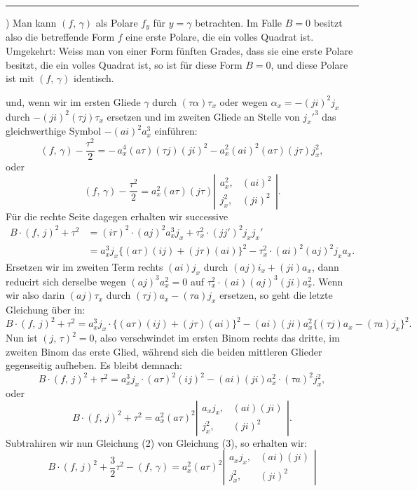 \documentclass[11pt]{article}
\providecommand{\weberpage}[1]{}
\providecommand{\weq}[2]{\begin{equation}\tag{#1}#2\end{equation}}
\begin{document}
\rule{4cm}{0.4pt}

\noindent *) Man kann $(f,\,\gamma)$ als Polare $f_y$ f\"ur $y=\gamma$ betrachten. Im Falle $B=0$
besitzt also die betreffende Form $f$ eine erste Polare, die ein volles Quadrat ist.
Umgekehrt: Weiss man von einer Form f\"unften Grades, dass sie eine erste Polare
besitzt, die ein volles Quadrat ist, so ist f\"ur diese Form $B=0$, und diese Polare
ist mit $(f,\,\gamma)$ identisch.


\weberpage{264}
und, wenn wir im ersten Gliede $\gamma$ durch $(\tau\alpha)\tau_x$ oder wegen $\alpha_x=-(ji)^2j_x$
durch $-(ji)^2(\tau j)\tau_x$ ersetzen und im zweiten Gliede an Stelle von $j_x'^3$
das gleichwerthige Symbol $-(ai)^2a_x^3$ einf\"uhren:
\[
(f,\,\gamma) - \frac{\tau^2}{2} = -\,a_x^4(a\tau)(\tau j)(ji)^2 - a_x^2(ai)^2(a\tau)(j\tau)j_x^2,
\]
oder
\weq{2}{(f,\,\gamma) - \frac{\tau^2}{2} = a_x^2(a\tau)(j\tau)\left|\begin{array}{cc} a_x^2, & (ai)^2 \\ j_x^2, & (ji)^2 \end{array}\right|.}
F\"ur die rechte Seite dagegen erhalten wir successive
\[
\begin{aligned}
B\cdot(f,\,j)^2+\tau^2 &= (i\tau)^2\cdot(aj)^2a_x^3j_x+\tau_x^2\cdot(jj')^2j_xj_x' \\
&= a_x^3j_x\{(a\tau)(ij)+(j\tau)(ai)\}^2-\tau_x^2\cdot(ai)^2(aj)^2j_xa_x.
\end{aligned}
\]
Ersetzen wir im zweiten Term rechts $(ai)j_x$ durch $(aj)i_x+(ji)a_x$,
dann reducirt sich derselbe wegen $(aj)^3a_x^2=0$ auf $\tau_x^2\cdot(ai)(aj)^3(ji)a_x^2$.
Wenn wir also darin $(aj)\tau_x$ durch $(\tau j)a_x-(\tau a)j_x$ ersetzen, so geht
die letzte Gleichung \"uber in:
\[
B\cdot(f,\,j)^2+\tau^2 = a_x^3j_x\cdot\{(a\tau)(ij)+(j\tau)(ai)\}^2 - (ai)(ji)a_x^2\{(\tau j)a_x-(\tau a)j_x\}^2.
\]
Nun ist $(j,\,\tau)^2=0$, also verschwindet im ersten Binom rechts
das dritte, im zweiten Binom das erste Glied, w\"ahrend sich die beiden
mittleren Glieder gegenseitig aufheben. Es bleibt demnach:
\[
B\cdot(f,\,j)^2+\tau^2 = a_x^3j_x\cdot(a\tau)^2(ij)^2 - (ai)(ji)a_x^2\cdot(\tau a)^2j_x^2,
\]
oder
\weq{3}{B\cdot(f,\,j)^2+\tau^2 = a_x^2(a\tau)^2\left|\begin{array}{cc} a_xj_x, & (ai)(ji) \\ j_x^2, & (ji)^2 \end{array}\right|.}
Subtrahiren wir nun Gleichung (2) von Gleichung (3), so erhalten
 wir:
\[
B\cdot(f,\,j)^2 + \frac{3}{2}\tau^2 - (f,\,\gamma) = a_x^2(a\tau)^2\left|\begin{array}{cc} a_xj_x, & (ai)(ji) \\ j_x^2, & (ji)^2 \end{array}\right|
\]
\end{document}
